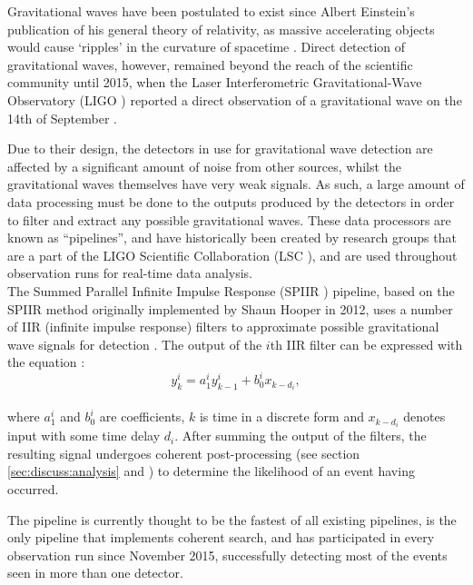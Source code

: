 \documentclass{article}
\begin{document}
Gravitational waves have been postulated to exist since Albert Einstein's publication of his general theory of relativity, as massive accelerating objects would cause `ripples' in the curvature of spacetime \cite{ligo_einstein}.
Direct detection of gravitational waves, however, remained beyond the reach of the scientific community until 2015, when the Laser Interferometric Gravitational-Wave Observatory (LIGO \cite[see][]{LIGO}) reported a direct observation of a gravitational wave on the 14th of September \cite{FirstDetectionPaper, DetectionWeb}.

Due to their design, the detectors in use for gravitational wave detection are affected by a significant amount of noise from other sources, whilst the gravitational waves themselves have very weak signals.
As such, a large amount of data processing must be done to the outputs produced by the detectors in order to filter and extract any possible gravitational waves.
These data processors are known as ``pipelines'', and have historically been created by research groups that are a part of the LIGO Scientific Collaboration (LSC \cite[see][]{LSC}), and are used throughout observation runs for real-time data analysis.
\\

The Summed Parallel Infinite Impulse Response (SPIIR \cite[see][]{spiir}) pipeline, based on the SPIIR method originally implemented by Shaun Hooper in 2012, uses a number of IIR (infinite impulse response) filters to approximate possible gravitational wave signals for detection \cite{SPIIRCreate}.
The output of the \(i\)th IIR filter can be expressed with the equation \cite{SPIIRGPU2018}:
\begin{equation}
    y^i_k = a^i_1y^i_{k-1} + b^i_0x_{k-d_i},
\end{equation}
\\
where \(a^i_1\) and \(b^i_0\) are coefficients, \(k\) is time in a discrete form and \(x_{k-d_i}\) denotes input with some time delay \(d_i\).
After summing the output of the filters, the resulting signal undergoes coherent post-processing (see section \ref{sec:discuss:analysis} and \cite[chapter 4]{ChuThesis}) to determine the likelihood of an event having occurred.

The pipeline is currently thought to be the fastest of all existing pipelines, is the only pipeline that implements coherent search, and has participated in every observation run since November 2015, successfully detecting most of the events seen in more than one detector.
\end{document}
